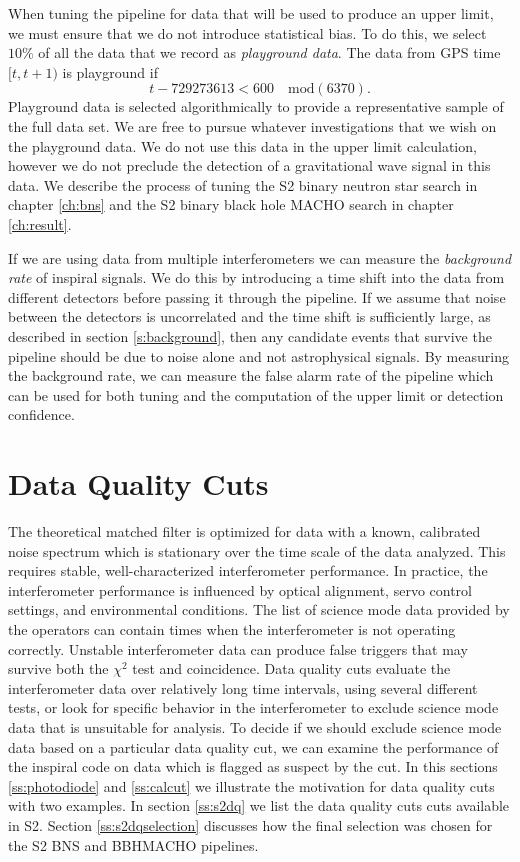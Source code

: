 When tuning the pipeline for data that will be used to produce an upper limit,
we must ensure that we do not introduce statistical bias. To do this, we
select $10\%$ of all the data that we record as \emph{playground data}. The
data from GPS time $[t,t+1)$ is playground if 
\begin{equation}
t - 729273613 < 600 \quad \mathrm{mod}(6370).
\end{equation}
Playground data is selected algorithmically to provide a representative sample
of the full data set. We are free to pursue whatever investigations that we
wish on the playground data. We do not use this data in the upper limit
calculation, however we do not preclude the detection of a gravitational wave
signal in this data. We describe the process of tuning the S2 binary neutron
star search in chapter \ref{ch:bns} and the S2 binary black hole MACHO search
in chapter \ref{ch:result}.

If we are using data from multiple interferometers we can measure the
\emph{background rate} of inspiral signals. We do this by introducing a time
shift into the data from different detectors before passing it through the
pipeline. If we assume that noise between the detectors is uncorrelated and
the time shift is sufficiently large, as described in section
\ref{s:background}, then any candidate events that survive the pipeline should
be due to noise alone and not astrophysical signals. By measuring the
background rate, we can measure the false alarm rate of the pipeline which can
be used for both tuning and the computation of the upper limit or detection
confidence.

\section{Data Quality Cuts}
\label{s:dq}

The theoretical matched filter is optimized for data with a known, calibrated
noise spectrum which is stationary over the time scale of the data analyzed.
This requires stable, well-characterized interferometer performance. In practice,
the interferometer performance is influenced by optical alignment, servo
control settings, and environmental conditions. The list of science mode data
provided by the operators can contain times when the interferometer is not
operating correctly. Unstable interferometer data can produce false triggers
that may survive both the $\chi^2$ test and coincidence.  Data quality cuts
evaluate the interferometer data over relatively long time intervals, using
several different tests, or look for specific behavior in the interferometer
to exclude science mode data that is unsuitable for analysis.  To decide if we
should exclude science mode data based on a particular data quality cut, we
can examine the performance of the inspiral code on data which is flagged as
suspect by the cut. In this sections \ref{ss:photodiode} and \ref{ss:calcut}
we illustrate the motivation for data quality cuts with two examples. In
section \ref{ss:s2dq} we list the data quality cuts cuts available in S2.
Section \ref{ss:s2dqselection} discusses how the final selection was chosen for
the S2 BNS and BBHMACHO pipelines.

